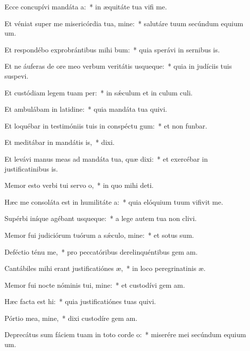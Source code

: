 \item Ecce concupívi mandáta a:~* in æquitáte tua vifi me.
\item Et véniat super me misericórdia tua, mine:~* salutáre tuum secúndum equium um.
\item Et respondébo exprobrántibus mihi bum:~* quia sperávi in sernibus is.
\item Et ne áuferas de ore meo verbum veritátis usqueque:~* quia in judíciis tuis suspevi.
\item Et custódiam legem tuam per:~* in sǽculum et in culum culi.
\item Et ambulábam in latidine:~* quia mandáta tua quivi.
\item Et loquébar in testimóniis tuis in conspéctu gum:~* et non funbar.
\item Et meditábar in mandátis is,~*  dixi.
\item Et levávi manus meas ad mandáta tua, quæ dixi:~* et exercébar in justificatinibus is.
\item Memor esto verbi tui servo o,~* in quo mihi  deti.
\item Hæc me consoláta est in humilitáte a:~* quia elóquium tuum vifivit me.
\item Supérbi iníque agébant usqueque:~* a lege autem tua non clivi.
\item Memor fui judiciórum tuórum a sǽculo, mine:~* et sotus sum.
\item Deféctio ténu me,~* pro peccatóribus derelinquéntibus gem am.
\item Cantábiles mihi erant justificatiónes æ,~* in loco peregrinatinis æ.
\item Memor fui nocte nóminis tui, mine:~* et custodívi gem am.
\item Hæc facta est hi:~* quia justificatiónes tuas quivi.
\item Pórtio mea, mine,~* dixi custodíre gem am.
\item Deprecátus sum fáciem tuam in toto corde o:~* miserére mei secúndum equium um.
